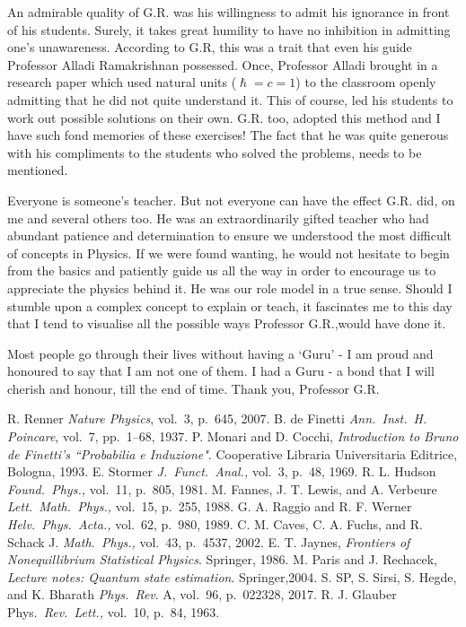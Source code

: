 An admirable quality of G.R. was his willingness to admit his ignorance in front of
his students. Surely, it takes great humility to have no inhibition in admitting one’s
unawareness. According to G.R, this was a trait that even his guide Professor Alladi
Ramakrishnan possessed. Once, Professor Alladi brought in a research paper which
used natural units ($\hslash = c = 1$) to the classroom openly admitting that he did not quite
understand it. This of course, led his students to work out possible solutions on their
own. G.R. too, adopted this method and I have such fond memories of these exercises!
The fact that he was quite generous with his compliments to the students who solved
the problems, needs to be mentioned.


Everyone is someone's teacher. But not everyone can have the effect G.R. did, on
me and several others too. He was an extraordinarily gifted teacher who had abundant
patience and determination to ensure we understood the most difficult of concepts in
Physics. If we were found wanting, he would not hesitate to begin from the basics and
patiently guide us all the way in order to encourage us to appreciate the physics behind
it. He was our role model in a true sense. Should I stumble upon a complex concept
to explain or teach, it fascinates me to this day that I tend to visualise all the possible
ways Professor G.R.,would have done it.


Most people go through their lives without having a ‘Guru’ - I am proud and honoured to say that I am not one of them. I had a Guru - a bond that I will cherish and
honour, till the end of time. Thank you, Professor G.R.




\begin{thebibliography}{99}
 R. Renner \textit{Nature Physics}, vol.\ 3, p.\ 645, 2007.
 B. de Finetti \textit{Ann.\ Inst.\ H. Poincare}, vol.\ 7, pp.\ 1--68, 1937.
 P. Monari and D. Cocchi, \textit{Introduction to Bruno de Finetti's ``Probabilia e Induzione"}. Cooperative Libraria Universitaria Editrice, Bologna, 1993.
 E. Stormer \textit{J.\ Funct.\ Anal.,} vol.\ 3, p.\ 48, 1969.
 R. L. Hudson \textit{Found.\ Phys.,} vol.\ 11, p.\ 805, 1981.
 M. Fannes, J. T. Lewis, and A. Verbeure \textit{Lett.\ Math.\ Phys.,} vol.\ 15, p.\ 255, 1988.
 G. A. Raggio and R. F. Werner \textit{Helv.\ Phys.\ Acta.,} vol.\ 62, p.\ 980, 1989.
 C. M. Caves, C. A. Fuchs, and R. Schack J. \textit{Math.\ Phys.,} vol.\ 43, p.\ 4537, 2002.
 E. T. Jaynes, \textit{Frontiers of Nonequillibrium Statistical Physics}. Springer, 1986.
 M. Paris and J. Rechacek, \textit{Lecture notes: Quantum state estimation}. Springer,2004.
 S. SP, S. Sirsi, S. Hegde, and K. Bharath \textit{Phys.\ Rev}. A, vol.\ 96, p.\ 022328, 2017.
 R. J. Glauber Phys.\ \textit{Rev.\ Lett.,} vol.\ 10, p.\ 84, 1963.
\end{thebibliography}
\vskip 1cm

